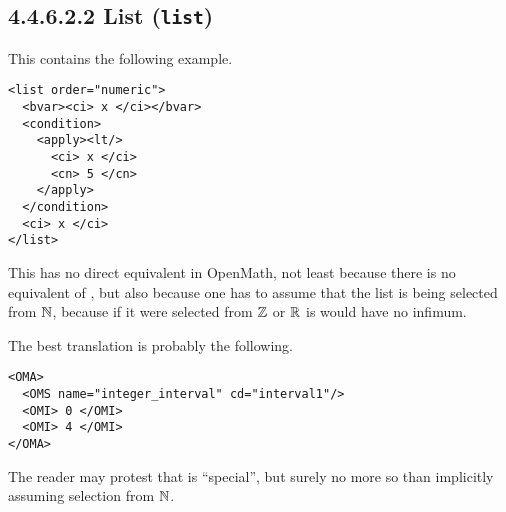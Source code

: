 \documentclass{llncs}
\begin{document}
{\subsection{4.4.6.2.2 List ({\tt list})}\label{44622}
This contains the following example.
\begin{lstlisting}[language=MathML2]
<list order="numeric">
  <bvar><ci> x </ci></bvar>
  <condition>
    <apply><lt/>
      <ci> x </ci>
      <cn> 5 </cn>
    </apply>
  </condition>
  <ci> x </ci>
</list>
\end{lstlisting}
This has no direct equivalent in OpenMath, not least because there is no
equivalent of {}, but also because one has to assume that
the list is being selected from $\mathbb{N}$, because if it were selected from $\mathbb{Z}$ or
$\mathbb{R}$ is would have no infimum.
\par
The best translation is probably the following.
\begin{lstlisting}
<OMA>
  <OMS name="integer_interval" cd="interval1"/>
  <OMI> 0 </OMI>
  <OMI> 4 </OMI>
</OMA>
\end{lstlisting}
The reader may protest that {} is ``special'', but surely no
more so than implicitly assuming selection from $\mathbb{N}$.

}
\end{document}
